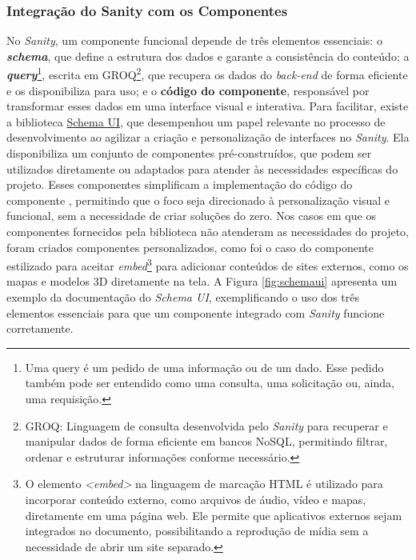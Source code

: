    \subsubsection{Integração do Sanity com os Componentes}
    No \textit{Sanity}, um componente funcional depende de três elementos essenciais: o \textit{\textbf{schema}}, que define a estrutura dos dados e garante a consistência do conteúdo; a \textit{\textbf{query}}\footnote{Uma query é um pedido de uma informação ou de um dado. Esse pedido também pode ser entendido como uma consulta, uma solicitação ou, ainda, uma requisição.}, escrita em GROQ\footnote{GROQ: Linguagem de consulta desenvolvida pelo \textit{Sanity} para recuperar e manipular dados de forma eficiente em bancos NoSQL, permitindo filtrar, ordenar e estruturar informações conforme necessário.}, que recupera os dados do \textit{back-end} de forma eficiente e os disponibiliza para uso; e o \textbf{código do componente}, responsável por transformar esses dados em uma interface visual e interativa.
    Para facilitar, existe a biblioteca \href{https://schemaui.com/docs/}{Schema UI}, que desempenhou um papel relevante no processo de desenvolvimento ao agilizar a criação e personalização de interfaces no \textit{Sanity}. Ela disponibiliza um conjunto de componentes pré-construídos, que podem ser utilizados diretamente ou adaptados para atender às necessidades específicas do projeto. Esses componentes simplificam a implementação do código do componente , permitindo que o foco seja direcionado à personalização visual e funcional, sem a necessidade de criar soluções do zero. Nos casos em que os componentes fornecidos pela biblioteca não atenderam as necessidades do projeto, foram criados componentes personalizados, como foi o caso do componente estilizado para aceitar \textit{embed}\footnote{O elemento\textit{ <embed>} na linguagem de marcação HTML é utilizado para incorporar conteúdo externo, como arquivos de áudio, vídeo e mapas, diretamente em uma página web. Ele permite que aplicativos externos sejam integrados no documento, possibilitando a reprodução de mídia sem a necessidade de abrir um site separado.} para adicionar conteúdos de sites externos, como os mapas e modelos 3D diretamente na tela. A Figura \ref{fig:schemaui} apresenta um exemplo da documentação do \textit{Schema UI}, exemplificando o uso dos três elementos essenciais para que um componente integrado com \textit{Sanity} funcione corretamente.

